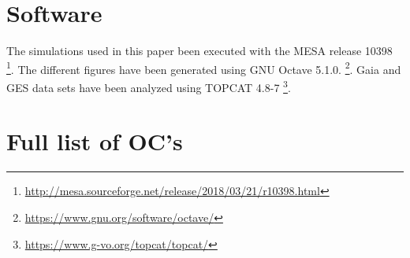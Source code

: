 \documentclass[fleqn,usenatbib]{mnras}
\begin{document}
\section*{Software}
The simulations used in this paper been executed with the MESA release 10398 \footnote{\url{http://mesa.sourceforge.net/release/2018/03/21/r10398.html}}. The different figures have been generated using GNU Octave 5.1.0. \footnote{\url{https://www.gnu.org/software/octave/}}.  Gaia and GES data sets have been analyzed using TOPCAT 4.8-7 \footnote{\url{https://www.g-vo.org/topcat/topcat/}}. 










\appendix
\section{Full list of OC's}
\end{document}
